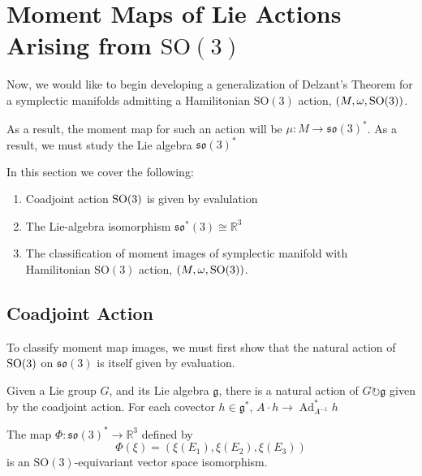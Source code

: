\section{Moment Maps of Lie Actions Arising from $\mathrm{SO}(3)$}
Now, we would like to begin developing a generalization of Delzant's  Theorem for a symplectic manifolds admitting a Hamilitonian $\mathrm{SO}(3)$ action, $(M, \omega, \rm{SO}(3))$. 

\begin{remark}
As a result, the moment map for such an action will be $\mu: M \to \mathfrak{so}(3)^{*}$. As a result, we must study the Lie algebra $\mathfrak{so}(3)^{*}$
\end{remark}

\noindent In this section we cover the following: 

\begin{enumerate}
    \item Coadjoint action $\rm{SO}(3)$ is given by evalulation
    \item The Lie-algebra isomorphism $ \mathfrak{so}^{*}(3) \cong \mathbb{R}^{3}$
    \item The classification of moment images of symplectic manifold with Hamilitonian $\mathrm{SO}(3)$ action, $(M, \omega, \rm{SO}(3))$. 
\end{enumerate}

\subsection{Coadjoint Action}

To classify moment map images, we must first show that the natural action of $\rm{SO}(3)$ on $\mathfrak{so}(3)$ is itself given by evaluation. 

\begin{defn}
Given a Lie group $G$, and its Lie algebra $\mathfrak{g}$, there is a natural action of $G \circlearrowright \mathfrak{g}$ given by the coadjoint action. For each covector $h \in \mathfrak{g}^{*}$, $A \cdot h \to \operatorname{Ad}_{A^{-1}}^{*} h$
\end{defn}

\begin{lemma}\label{lem:so3-isomorphism}
The map $\Phi: \mathfrak{so}(3)^{*} \to \mathbb{R}^{3}$ defined by
\[
\Phi(\xi) = \left( \xi(E_{1}), \xi(E_{2}), \xi(E_{3}) \right)
\]
\noindent is an $\mathrm{SO}(3)$-equivariant vector space isomorphism.
\end{lemma}

